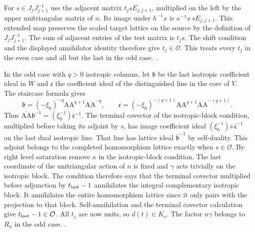 For \(s\in J_jJ_{j+1}^{-1}\) use the adjacent matrix
\(t_j s E_{j,j+1}\), multiplied on the left by the
upper unitriangular matrix of \(n\). Its image under
\(h^{-1}x\) is \(\kappa^{-1}x\,s E_{j,j+1}\).
This extended map preserves the scaled target lattice
on the source by the definition of \(J_jJ_{j+1}^{-1}\).
The sum of adjacent entries of the test matrix is
\(t_j s\). The shift condition and the displayed
annihilator identity therefore give \(t_j\in\mathcal O\).
This treats every \(t_j\) in the even case and all
but the last in the odd case.
.

In the odd case with \(q>0\) isotropic columns, let
\(\mathfrak b\) be the last isotropic coefficient ideal
in \(W\) and \(\mathfrak c\) the coefficient ideal of the
distinguished line in the core of \(V\). The staircase
formula gives
\[
 \mathfrak b=(-\xi_0)^{-q}\mathrm{AA}^{q+1}
                       \overline{\mathrm{AA}}^{-q},
 \qquad
 \mathfrak c=(-\xi_0)^{-(q+1)}\mathrm{AA}^{q+1}
                       \overline{\mathrm{AA}}^{-(q+1)}.
\]
Thus \(\overline{\mathrm{AA}}\mathfrak b^{-1}
=(\xi_0^{-1})\mathfrak c^{-1}\).
The terminal covector of the isotropic-block condition,
multiplied before taking its adjoint by \(s\), has
image coefficient ideal
\((\xi_0^{-1})\overline{s}\,\overline{\mathfrak c}^{-1}\)
on the last dual isotropic line. That line has lattice ideal
\(\overline{\mathfrak b}^{-1}\) by self-duality. This
adjoint belongs to the completed homomorphism lattice
exactly when \(s\in\mathcal O\).
By right level saturation remove \(\kappa\) in the
isotropic-block condition. The last coordinate of the
unitriangular action of \(n\) is fixed and \(\gamma\)
acts trivially on the isotropic block. The condition
therefore says that the terminal covector multiplied
before adjunction by \(t_{\rm last}-1\) annihilates the
integral complementary isotropic block. It annihilates
the entire homomorphism lattice since it only pairs
with the projection to that block. Self-annihilation
and the terminal covector calculation give
\(t_{\rm last}-1\in\mathcal O\).
All \(t_j\) are now units, so \(d(t)\in K_v\).
The factor \(n\gamma\) belongs to \(R_x\) in the
odd case.
.

